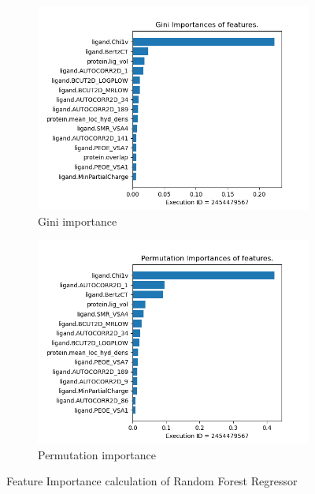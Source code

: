 \documentclass[11pt]{article}
\begin{document}
\begin{figure}
     \centering
     \begin{subfigure}[b]{0.45\textwidth}
         \centering
         \includegraphics[scale=0.45]{images/Gini_importance}
         \caption{Gini importance}
        \label{fig:GiniImportanceLabel}
     \end{subfigure}
     \hfill
     \begin{subfigure}[b]{0.45\textwidth}
         \centering
         \includegraphics[scale=0.45]{images/Permutation_importance}
        \caption{Permutation importance}
        \label{fig:PermutationImportanceLabel}
     \end{subfigure}
     \caption{Feature Importance calculation of Random Forest Regressor}
     \label{fig:RFMFILable}
\end{figure}
\end{document}
